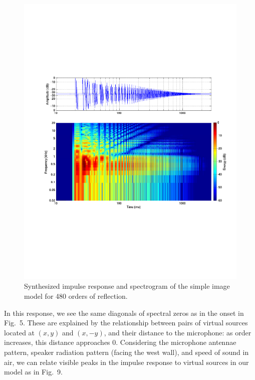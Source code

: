 \documentclass{aes137}
\begin{document}
\begin{figure}[h!] \centering \includegraphics[width=\linewidth]{images/IM_480c00_irsg_cropped.pdf} \caption{Synthesized impulse response and spectrogram of the simple image model for 480 orders of reflection.} \end{figure}

In this response, we see the same diagonals of spectral zeros as in the onset in Fig.~5. These are explained by the relationship between pairs of virtual sources located at $(x,y)$ and $(x,-y)$, and their distance to the microphone: as order increases, this distance approaches 0. Considering the
microphone antennae pattern, speaker radiation pattern (facing the
west wall), and speed of sound in air, we can relate visible peaks in
the impulse response to virtual sources in our model as in Fig.~9.
\end{document}
